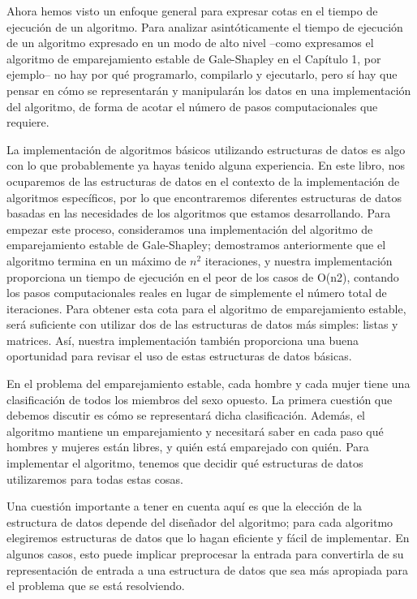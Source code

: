 \documentclass[a4paper, 12pt]{book}
\theoremstyle{dotless}
\begin{document}
Ahora hemos visto un enfoque general para expresar cotas en el tiempo de ejecución de un algoritmo. Para analizar asintóticamente el tiempo de ejecución de  un algoritmo expresado en un modo de alto nivel --como expresamos el algoritmo de emparejamiento estable de Gale-Shapley en el Capítulo 1, por ejemplo-- no hay por qué programarlo, compilarlo y ejecutarlo, pero sí hay que pensar en cómo se representarán y manipularán los datos en una implementación del algoritmo, de forma de acotar el número de pasos computacionales que requiere.

La implementación de algoritmos básicos utilizando estructuras de datos es algo con lo que probablemente ya hayas tenido alguna experiencia. En este libro, nos ocuparemos de las estructuras de datos en el contexto de la implementación de algoritmos específicos, por lo que encontraremos diferentes estructuras de datos basadas en las necesidades de los algoritmos que estamos desarrollando. Para empezar este proceso, consideramos una implementación del algoritmo de emparejamiento estable de Gale-Shapley; demostramos anteriormente que el algoritmo termina en un máximo de $n^2$ iteraciones, y nuestra implementación proporciona un tiempo de ejecución en el peor de los casos de O(n2), contando los pasos computacionales reales en lugar de simplemente el número total de iteraciones. Para obtener esta cota para el algoritmo de emparejamiento estable, será suficiente con utilizar dos
de las estructuras de datos más simples: listas y matrices. Así, nuestra implementación también proporciona una buena oportunidad para revisar el uso de estas estructuras de datos básicas.

En el problema del emparejamiento estable, cada hombre y cada mujer tiene una clasificación de todos los miembros del sexo opuesto. 
La primera cuestión que debemos discutir es cómo se representará dicha clasificación. Además, el algoritmo mantiene un emparejamiento y necesitará saber en cada paso qué hombres y mujeres están libres, y quién está emparejado con quién. 
Para implementar el algoritmo, tenemos que decidir qué estructuras de datos utilizaremos para todas estas cosas.

Una cuestión importante a tener en cuenta aquí es que la elección de la estructura de datos depende del diseñador del algoritmo; para cada algoritmo elegiremos estructuras de datos que lo hagan eficiente y fácil de implementar. En algunos casos, esto puede implicar preprocesar la entrada para convertirla de su representación de entrada a una estructura de datos que sea más apropiada para el problema que se está resolviendo.
\end{document}
